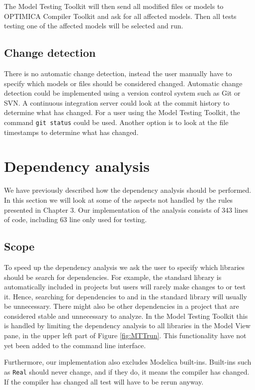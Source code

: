 \documentclass{cslthse-msc}
\begin{document}
The Model Testing Toolkit will then send all modified files or models to OPTIMICA Compiler Toolkit and ask for all affected models. Then all tests testing one of the affected models will be selected and run.

\subsection{Change detection}
There is no automatic change detection, instead the user manually have to specify which models or files should be considered changed. Automatic change detection could be implemented using a version control system such as Git or SVN. A continuous integration server could look at the commit history to determine what has changed. For a user using the Model Testing Toolkit, the command \texttt{git status} could be used. Another option is to look at the file timestamps to determine what has changed.

\section{Dependency analysis}
We have previously described how the dependency analysis should be performed. In this section we will look at some of the aspects not handled by the rules presented in Chapter 3. Our implementation of the analysis consists of 343 lines of code, including 63 line only used for testing.

\subsection{Scope}
To speed up the dependency analysis we ask the user to specify which libraries should be search for dependencies. For example, the standard library is automatically included in projects but users will rarely make changes to or test it. Hence, searching for dependencies to and in the standard library will usually be unnecessary. There might also be other dependencies in a project that are considered stable and unnecessary to analyze. In the Model Testing Toolkit this is handled by limiting the dependency analysis to all libraries in the Model View pane, in the upper left part of Figure \ref{fig:MTTrun}. This functionality have not yet been added to the command line interface.

Furthermore, our implementation also excludes Modelica built-ins. Built-ins such as \texttt{Real} should never change, and if they do, it means the compiler has changed. If the compiler has changed all test will have to be rerun anyway.
\end{document}
